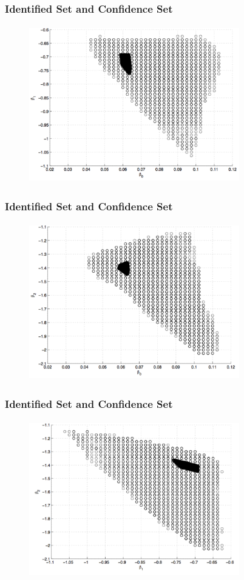 \documentclass[10pt,letterpaper]{beamer}
\begin{document}
\begin{frame}
\frametitle{Identified Set and Confidence Set}

\begin{figure}
\centering
\includegraphics[width=3.6in,height=2.7in]{b0b1fig.pdf}
\end{figure}
\end{frame}
\begin{frame}
\frametitle{Identified Set and Confidence Set}

\begin{figure}
\centering
\includegraphics[width=3.6in,height=2.7in]{b0b2fig.pdf}
\end{figure}
\end{frame}
\begin{frame}
\frametitle{Identified Set and Confidence Set}

\begin{figure}
\centering
\includegraphics[width=3.6in,height=2.7in]{b1b2fig.pdf}
\end{figure}
\end{frame}
\end{document}
